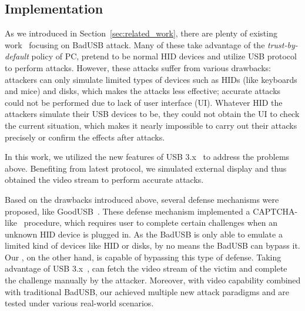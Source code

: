 \subsection{Implementation}
As we introduced in Section~\ref{sec:related_work}, there are plenty of
existing work~\cite{rubber,badusb,
rubberducky2020,usbbypassing,iseeyou,usbdriver} focusing on BadUSB attack.
Many of these take advantage of the \textit{trust-by-default} policy of PC,
pretend to be normal HID devices and utilize USB protocol to perform attacks.
However, these attacks suffer from various drawbacks:  attackers can
only simulate limited types of devices such as HIDs (like keyboards and mice)
and disks, which makes the attacks less effective;  accurate attacks
could not be performed due to lack of user interface (UI).  Whatever HID the
attackers simulate their USB devices to be, they could not obtain the UI to
check the current situation, which makes it nearly impossible to carry out
their attacks precisely or confirm the effects after attacks.

In this work, we utilized the new features of USB 3.x~\cite{usb31,usb32} to
address the problems above.  Benefiting from latest protocol, we simulated
external display and thus obtained the video stream to perform accurate
attacks.

Based on the drawbacks introduced above, several defense mechanisms were
proposed, like GoodUSB~\cite{tian2015defending}. These defense mechanism
implemented a CAPTCHA-like~\cite{captcha} procedure, which requires user to
complete certain challenges when an unknown HID device is plugged in. As the
BadUSB is only able to emulate a limited kind of devices like HID or disks, by
no means the BadUSB can bypass it. Our \tool, on the other hand, is capable of
bypassing this type of defense. Taking advantage of USB 3.x~\cite{usb31,usb32},
\tool can fetch the video stream of the victim and complete the challenge
manually by the attacker. Moreover, with video capability combined with
traditional BadUSB, our \tool achieved multiple new attack paradigms and are
tested under various real-world scenarios.

